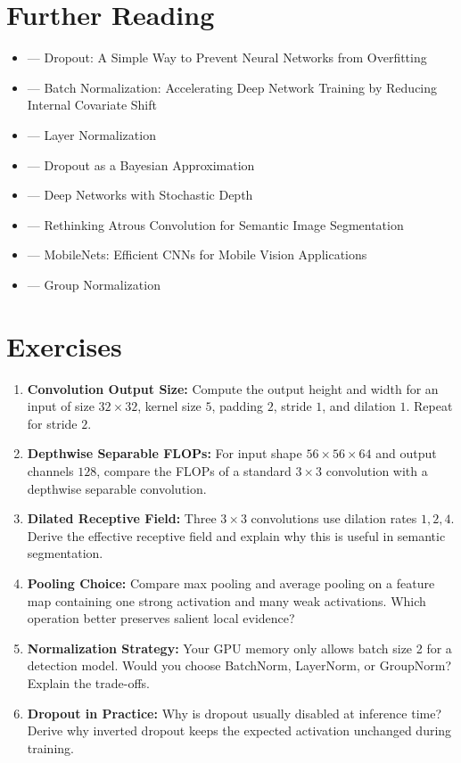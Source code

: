 \section{Further Reading}

\begin{itemize}
    \item \cite{srivastava2014dropout} --- Dropout: A Simple Way to Prevent Neural Networks from Overfitting
    \item \cite{ioffe2015batch} --- Batch Normalization: Accelerating Deep Network Training by Reducing Internal Covariate Shift
    \item \cite{ba2016layer} --- Layer Normalization
    \item \cite{gal2016dropout} --- Dropout as a Bayesian Approximation
    \item \cite{huang2016deep} --- Deep Networks with Stochastic Depth
    \item \cite{chen2017deeplab} --- Rethinking Atrous Convolution for Semantic Image Segmentation
    \item \cite{howard2017mobilenets} --- MobileNets: Efficient CNNs for Mobile Vision Applications
    \item \cite{wu2018group} --- Group Normalization
\end{itemize}

\section{Exercises}

\begin{enumerate}
    \item \textbf{Convolution Output Size:} Compute the output height and width for an input of size $32\times32$, kernel size $5$, padding $2$, stride $1$, and dilation $1$. Repeat for stride $2$.

    \item \textbf{Depthwise Separable FLOPs:} For input shape $56\times56\times64$ and output channels $128$, compare the FLOPs of a standard $3\times3$ convolution with a depthwise separable convolution.

    \item \textbf{Dilated Receptive Field:} Three $3\times3$ convolutions use dilation rates $1, 2, 4$. Derive the effective receptive field and explain why this is useful in semantic segmentation.

    \item \textbf{Pooling Choice:} Compare max pooling and average pooling on a feature map containing one strong activation and many weak activations. Which operation better preserves salient local evidence?

    \item \textbf{Normalization Strategy:} Your GPU memory only allows batch size 2 for a detection model. Would you choose BatchNorm, LayerNorm, or GroupNorm? Explain the trade-offs.

    \item \textbf{Dropout in Practice:} Why is dropout usually disabled at inference time? Derive why inverted dropout keeps the expected activation unchanged during training.
\end{enumerate}

